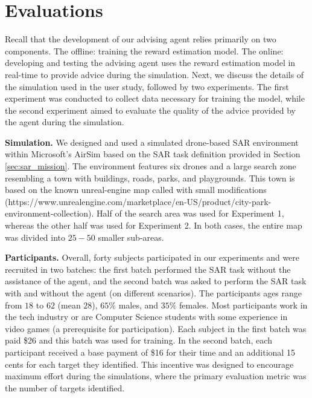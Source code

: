 
\section{Evaluations}

Recall that the development of our advising agent relies primarily on two components. The offline:  training the reward estimation model.
The online: developing and testing the advising agent uses the reward estimation model in real-time to provide advice during the simulation. 
Next, we discuss the details of the simulation used in the user study, followed by two experiments. The first experiment was conducted to collect data necessary for training the model, while the second experiment aimed to evaluate the quality of the advice provided by the agent during the simulation.

\noindent\textbf{Simulation.}
We designed and used a simulated drone-based SAR environment within Microsoft's AirSim based on the SAR task definition provided in Section \ref{sec:sar_mission}. The environment features six drones and a large search zone resembling a town with buildings, roads, parks, and playgrounds. This town is based on the known unreal-engine map called  with small modifications (https://www.unrealengine.com/marketplace/en-US/product/city-park-environment-collection). 
Half of the search area was used for Experiment 1, whereas the other half was used for Experiment 2. In both cases, the entire map was divided into $25-50$ smaller sub-areas. 

\noindent\textbf{Participants.}
Overall, forty subjects participated in our experiments and were recruited in two batches: the first batch performed the SAR task without the assistance of the agent, and the second batch was asked to perform the SAR task with and without the agent (on different scenarios).
The participants ages range from $18$ to $62$ (mean $28$), $65\%$ males, and $35\%$ females. Most participants work in the tech industry or are Computer Science students with some experience in video games (a prerequisite for participation). Each subject in the first batch was paid \$26 and this batch was used for training.  In the second batch, each participant received a base payment of \$16 for their time and an additional 15 cents for each target they identified. This incentive was designed to encourage maximum effort during the simulations, where the primary evaluation metric was the number of targets identified.

